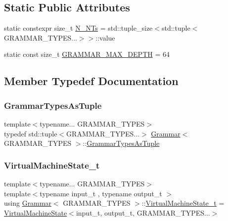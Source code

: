 \subsection*{Static Public Attributes}
\begin{DoxyCompactItemize}
\item 
static constexpr size\+\_\+t \hyperlink{class_grammar_a45877d4d7a5ee98bf6753af593d6ca08}{N\+\_\+\+N\+Ts} = std\+::tuple\+\_\+size$<$std\+::tuple$<$G\+R\+A\+M\+M\+A\+R\+\_\+\+T\+Y\+P\+E\+S...$>$$>$\+::value
\item 
static const size\+\_\+t \hyperlink{class_grammar_a4a0d1d38426ce7f1b68c001e9ddec064}{G\+R\+A\+M\+M\+A\+R\+\_\+\+M\+A\+X\+\_\+\+D\+E\+P\+TH} = 64
\end{DoxyCompactItemize}


\subsection{Member Typedef Documentation}
\mbox{\label{class_grammar_a5ba44586d1c6f847cbbeeead91964e3c}} 
\subsubsection{\texorpdfstring{Grammar\+Types\+As\+Tuple}{GrammarTypesAsTuple}}
{\footnotesize\ttfamily template$<$typename... G\+R\+A\+M\+M\+A\+R\+\_\+\+T\+Y\+P\+ES$>$ \\
typedef std\+::tuple$<$G\+R\+A\+M\+M\+A\+R\+\_\+\+T\+Y\+P\+E\+S...$>$ \hyperlink{class_grammar}{Grammar}$<$ G\+R\+A\+M\+M\+A\+R\+\_\+\+T\+Y\+P\+ES $>$\+::\hyperlink{class_grammar_a5ba44586d1c6f847cbbeeead91964e3c}{Grammar\+Types\+As\+Tuple}}

\mbox{\label{class_grammar_a30c2eaa4b378738686365fc6d8697f61}} 
\subsubsection{\texorpdfstring{Virtual\+Machine\+State\+\_\+t}{VirtualMachineState\_t}}
{\footnotesize\ttfamily template$<$typename... G\+R\+A\+M\+M\+A\+R\+\_\+\+T\+Y\+P\+ES$>$ \\
template$<$typename input\+\_\+t , typename output\+\_\+t $>$ \\
using \hyperlink{class_grammar}{Grammar}$<$ G\+R\+A\+M\+M\+A\+R\+\_\+\+T\+Y\+P\+ES $>$\+::\hyperlink{class_grammar_a30c2eaa4b378738686365fc6d8697f61}{Virtual\+Machine\+State\+\_\+t} =  \hyperlink{class_virtual_machine_state}{Virtual\+Machine\+State}$<$input\+\_\+t, output\+\_\+t, G\+R\+A\+M\+M\+A\+R\+\_\+\+T\+Y\+P\+E\+S...$>$}




